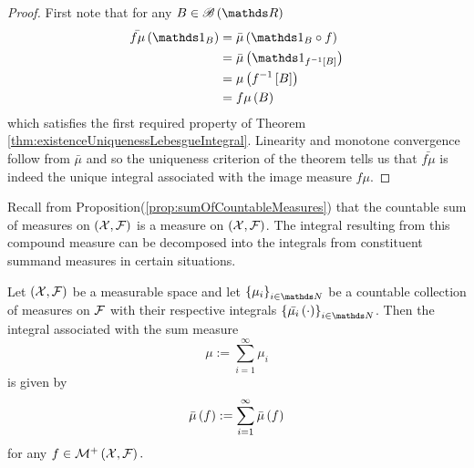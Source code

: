 \begin{proof}
First note that for any $B\in\borel\left(\R\right)$
\begin{align*}
\lebInt{f\mu}{\indicate_{B}} & =\lebInt{\mu}{\indicate_{B}\circ f}\\
 & =\lebInt{\mu}{\indicate_{f^{-1}\left[B\right]}}\\
 & =\mu\left(f^{-1}\left[B\right]\right)\\
 & =f\mu\left(B\right)
\end{align*}
which satisfies the first required property of Theorem \ref{thm:existenceUniquenessLebesgueIntegral}.
Linearity and monotone convergence follow from $\bar{\mu}$ and so
the uniqueness criterion of the theorem tells us that $\bar{f\mu}$
is indeed the unique integral associated with the image measure $f\mu$.
\end{proof}
Recall from Proposition(\ref{prop:sumOfCountableMeasures}) that the
countable sum of measures on $\left(\mathcal{X},\mathcal{F}\right)$ is a measure on
$\left(\mathcal{X},\mathcal{F}\right)$. The integral resulting from this compound measure
can be decomposed into the integrals from constituent summand measures
in certain situations.
\begin{prop}
\label{prop:integralSumOfMeasures}Let $\left(\mathcal{X},\mathcal{F}\right)$ be a
measurable space and let $\left\{ \mu_{i}\right\} _{i\in\N}$ be a
countable collection of measures on $\mathcal{F}$ with their respective integrals
$\left\{ \lebInt{\mu_{i}}{\cdot}\right\} _{i\in\N}$. Then the integral
associated with the sum measure
\[
\mu:=\sum_{i=1}^{\infty}\mu_{i}
\]
is given by
\[
\bar{\mu}\left(f\right):=\sum_{i=1}^{\infty}\bar{\mu}\left(f\right)
\]
for any $f\in\mathcal{M}^{+}\left(\mathcal{X},\mathcal{F}\right).$
\end{prop}

